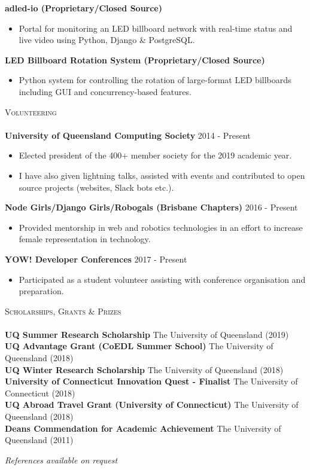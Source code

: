 \documentclass[a4paper]{article}
\newcommand{\lineunder} {
    \vspace*{-8pt} \\
    \hspace*{-10pt} \hrulefill \\
}
\newcommand{\header} [1] {
    {\hspace*{-10pt}\vspace*{6pt} \textsc{#1}}
    \vspace*{-6pt} \lineunder
}
\newenvironment{singleitem}
{   \small
    \vspace{-2.6pt}
    \begin{itemize}
    \setlength{\itemsep}{0pt}
    \setlength{\parskip}{0pt}
    \setlength{\parsep}{0pt}   }
{\end{itemize} \vspace{-2.6pt}	}
\begin{document}
\textbf{adled-io (Proprietary/Closed Source)}
\begin{singleitem}
	\item Portal for monitoring an LED billboard network with real-time status and live video using Python, Django \& PostgreSQL.
\end{singleitem}

\textbf{LED Billboard Rotation System (Proprietary/Closed Source)}
\begin{singleitem}
	\item Python system for controlling the rotation of large-format LED billboards including GUI and concurrency-based features.
\end{singleitem}

\vspace{0mm}

\header{Volunteering}
\textbf{University of Queensland Computing Society} \hfill 2014 - Present\\
\begin{singleitem}
	\item Elected president of the 400+ member society for the 2019 academic year.
	\item I have also given lightning talks, assisted with events and contributed to open source projects (websites, Slack bots etc.).
\end{singleitem}
\textbf{Node Girls/Django Girls/Robogals (Brisbane Chapters)} \hfill 2016 - Present\\
\begin{singleitem}
	\item Provided mentorship in web and robotics technologies in an effort to increase female representation in technology.
\end{singleitem}
\textbf{YOW! Developer Conferences} \hfill 2017 - Present\\
\begin{singleitem}
	\item Participated as a student volunteer assisting with conference organisation and preparation.
\end{singleitem}

\header{Scholarships, Grants \& Prizes}
\textbf{UQ Summer Research Scholarship} \hfill The University of Queensland (2019)\\
\textbf{UQ Advantage Grant (CoEDL Summer School)} \hfill The University of Queensland (2018)\\
\textbf{UQ Winter Research Scholarship} \hfill The University of Queensland (2018)\\
\textbf{University of Connecticut Innovation Quest - Finalist} \hfill The University of Connecticut (2018)\\
\textbf{UQ Abroad Travel Grant (University of Connecticut)} \hfill The University of Queensland (2018)\\
\textbf{Dean\textquotesingle{}s Commendation for Academic Achievement} \hfill The University of Queensland (2011)\\


\vspace{3mm}
\begin{center}
\small \textit{References available on request}
\end{center}
\end{document}
